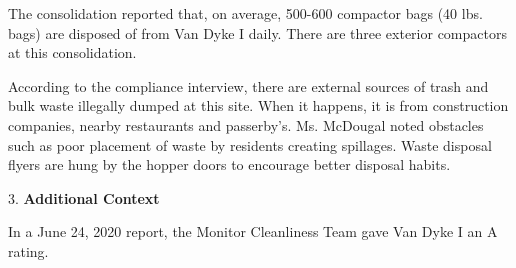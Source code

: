 The consolidation reported that, on average, 500-600 compactor bags (40 lbs. bags) are disposed of from Van Dyke I daily. There are three exterior compactors at this consolidation.

According to the compliance interview, there are external sources of trash and bulk waste illegally dumped at this site.  When it happens, it is from construction companies, nearby restaurants and passerby's. Ms. McDougal noted obstacles such as poor placement of waste by residents creating spillages. Waste disposal flyers are hung by the hopper doors to encourage better disposal habits. 

3. \textbf{Additional Context}

In a June 24, 2020 report, the Monitor Cleanliness Team gave Van Dyke I  an A rating. 